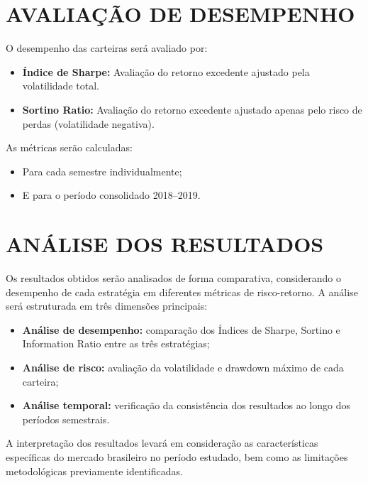 \section{AVALIAÇÃO DE DESEMPENHO}

O desempenho das carteiras será avaliado por:

\begin{itemize}
    \item \textbf{Índice de Sharpe:} Avaliação do retorno excedente ajustado pela volatilidade total.
    \item \textbf{Sortino Ratio:} Avaliação do retorno excedente ajustado apenas pelo risco de perdas (volatilidade negativa).
\end{itemize}

As métricas serão calculadas:
\begin{itemize}
    \item Para cada semestre individualmente;
    \item E para o período consolidado 2018--2019.
\end{itemize}

\section{ANÁLISE DOS RESULTADOS}

Os resultados obtidos serão analisados de forma comparativa, considerando o desempenho de cada estratégia em diferentes métricas de risco-retorno. A análise será estruturada em três dimensões principais:

\begin{itemize}
    \item \textbf{Análise de desempenho:} comparação dos Índices de Sharpe, Sortino e Information Ratio entre as três estratégias;
    \item \textbf{Análise de risco:} avaliação da volatilidade e drawdown máximo de cada carteira;
    \item \textbf{Análise temporal:} verificação da consistência dos resultados ao longo dos períodos semestrais.
\end{itemize}

A interpretação dos resultados levará em consideração as características específicas do mercado brasileiro no período estudado, bem como as limitações metodológicas previamente identificadas.


